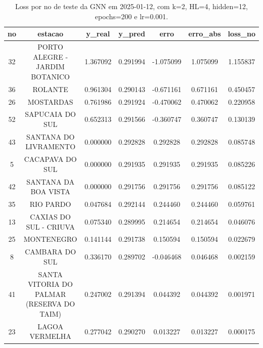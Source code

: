 \begin{table}[h]
\centering
\caption{Loss por no de teste da GNN em 2025-01-12, com k=2, HL=4, hidden=12, epochs=200 e lr=0.001.}
\label{tab:gnn_loss_k2_hl4_h12_e200_d20250112}
\begin{tabular}{ccccccc}
\toprule
no & estacao & y\_real & y\_pred & erro & erro\_abs & loss\_no \\
\midrule
32 & PORTO ALEGRE - JARDIM BOTANICO & 1.367092 & 0.291994 & -1.075099 & 1.075099 & 1.155837 \\
36 & ROLANTE & 0.961304 & 0.290143 & -0.671161 & 0.671161 & 0.450457 \\
26 & MOSTARDAS & 0.761986 & 0.291924 & -0.470062 & 0.470062 & 0.220958 \\
52 & SAPUCAIA DO SUL & 0.652313 & 0.291566 & -0.360747 & 0.360747 & 0.130139 \\
43 & SANTANA DO LIVRAMENTO & 0.000000 & 0.292828 & 0.292828 & 0.292828 & 0.085748 \\
5 & CACAPAVA DO SUL & 0.000000 & 0.291935 & 0.291935 & 0.291935 & 0.085226 \\
42 & SANTANA DA BOA VISTA & 0.000000 & 0.291756 & 0.291756 & 0.291756 & 0.085122 \\
35 & RIO PARDO & 0.047684 & 0.292144 & 0.244460 & 0.244460 & 0.059761 \\
13 & CAXIAS DO SUL - CRIUVA & 0.075340 & 0.289995 & 0.214654 & 0.214654 & 0.046076 \\
25 & MONTENEGRO & 0.141144 & 0.291738 & 0.150594 & 0.150594 & 0.022679 \\
8 & CAMBARA DO SUL & 0.336170 & 0.289702 & -0.046468 & 0.046468 & 0.002159 \\
41 & SANTA VITORIA DO PALMAR (RESERVA DO TAIM) & 0.247002 & 0.291394 & 0.044392 & 0.044392 & 0.001971 \\
23 & LAGOA VERMELHA & 0.277042 & 0.290270 & 0.013227 & 0.013227 & 0.000175 \\
\bottomrule
\end{tabular}
\end{table}
